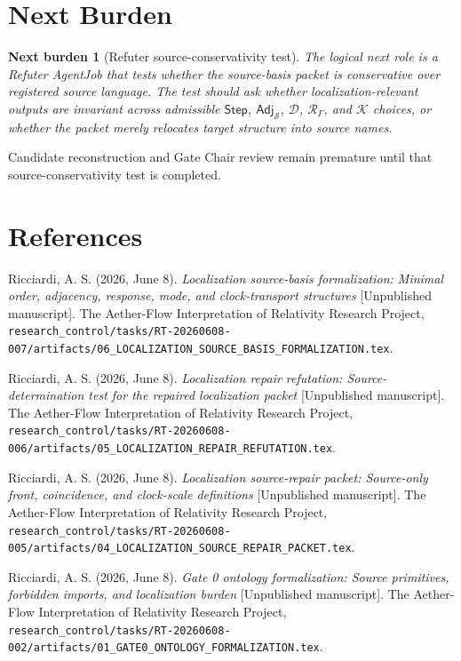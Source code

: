 \documentclass[11pt]{article}
\newcommand{\Step}{\mathsf{Step}}
\newcommand{\Adj}{\mathsf{Adj}_{\mathcal{S}}}
\newcommand{\RespAlg}{\mathcal{R}_{\Gamma}}
\newtheorem{nextburden}{Next burden}
\begin{document}
\section{Next Burden}

\begin{nextburden}[Refuter source-conservativity test]
The logical next role is a Refuter AgentJob that tests whether the
source-basis packet is conservative over registered source language. The test
should ask whether localization-relevant outputs are invariant across
admissible \(\Step\), \(\Adj\), \(\mathcal{D}\), \(\RespAlg\), and
\(\mathcal{K}\) choices, or whether the packet merely relocates target
structure into source names.
\end{nextburden}

Candidate reconstruction and Gate Chair review remain premature until that
source-conservativity test is completed.

\section*{References}

Ricciardi, A. S. (2026, June 8). \emph{Localization source-basis
formalization: Minimal order, adjacency, response, mode, and clock-transport
structures} [Unpublished manuscript]. The Aether-Flow Interpretation of
Relativity Research Project,
\texttt{research\_control/tasks/RT-20260608-007/artifacts/06\_LOCALIZATION\_SOURCE\_BASIS\_FORMALIZATION.tex}.

Ricciardi, A. S. (2026, June 8). \emph{Localization repair refutation:
Source-determination test for the repaired localization packet} [Unpublished
manuscript]. The Aether-Flow Interpretation of Relativity Research Project,
\texttt{research\_control/tasks/RT-20260608-006/artifacts/05\_LOCALIZATION\_REPAIR\_REFUTATION.tex}.

Ricciardi, A. S. (2026, June 8). \emph{Localization source-repair packet:
Source-only front, coincidence, and clock-scale definitions} [Unpublished
manuscript]. The Aether-Flow Interpretation of Relativity Research Project,
\texttt{research\_control/tasks/RT-20260608-005/artifacts/04\_LOCALIZATION\_SOURCE\_REPAIR\_PACKET.tex}.

Ricciardi, A. S. (2026, June 8). \emph{Gate 0 ontology formalization: Source
primitives, forbidden imports, and localization burden} [Unpublished
manuscript]. The Aether-Flow Interpretation of Relativity Research Project,
\texttt{research\_control/tasks/RT-20260608-002/artifacts/01\_GATE0\_ONTOLOGY\_FORMALIZATION.tex}.
\end{document}
